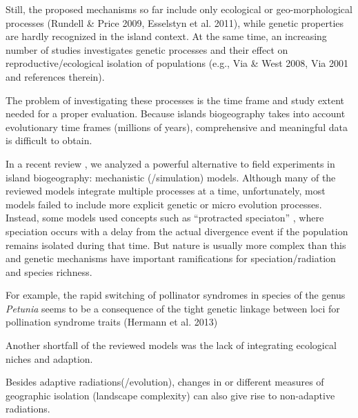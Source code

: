 \documentclass[a4paper]{scrartcl}
\begin{document}
Still, the proposed mechanisms so far include only ecological or geo-morphological processes (Rundell \& Price 2009, Esselstyn et al. 2011),
while genetic properties are hardly recognized in the island context.
At the same time, an increasing number of studies investigates genetic processes and
their effect on reproductive/ecological isolation of populations (e.g., Via \& West 2008, Via 2001 and references therein).

The problem of investigating these processes is the time frame and study extent needed for a proper evaluation.
Because islands biogeography takes into account evolutionary time frames (millions of years),
comprehensive and meaningful data is difficult to obtain.

In a recent review \cite{leidinger2017biodiversity}, we analyzed a powerful alternative to field experiments in island biogeography: mechanistic (/simulation) models.
Although many of the reviewed models integrate multiple processes at a time, unfortunately, most models failed to include more explicit genetic or micro evolution processes.
Instead, some models used concepts such as ``protracted speciaton'' \cite{rosindellXXX},
where speciation occurs with a delay from the actual
divergence event if the population remains isolated during that time.
But nature is usually more complex than this and genetic mechanisms have important ramifications for speciation/radiation and species richness.


For example, the rapid switching of pollinator syndromes in species of the genus \textit{Petunia} %
seems to be a consequence of the tight genetic linkage between loci for pollination syndrome traits (Hermann et al. 2013) %

Another shortfall of the reviewed models was the lack of integrating ecological niches and adaption.

Besides adaptive radiations(/evolution), changes in or different measures of geographic isolation (landscape complexity) can also give rise to non-adaptive radiations.
\end{document}
